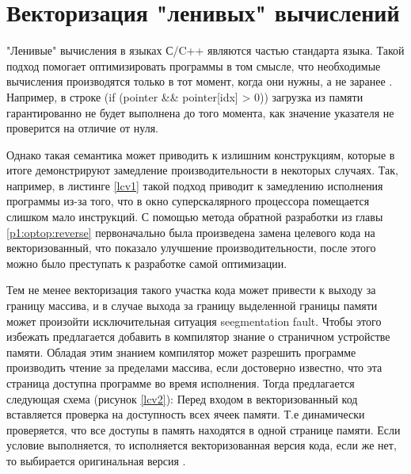  \section {Векторизация "ленивых"\phantom{ } вычислений}\label{ch2:lcv}
 "Ленивые"\phantom{ } вычисления в языках С/C++ являются частью стандарта языка. Такой подход помогает оптимизировать программы в том смысле, что необходимые вычисления производятся только в тот момент, когда они нужны, а не заранее \cite{cukic2018functional}. Например, в строке (if (pointer \&\& pointer[idx] > 0)) загрузка из памяти гарантированно  не будет выполнена до того момента, как значение указателя не проверится на отличие от нуля. 
 
 Однако такая семантика может приводить к излишним конструкциям, которые в итоге демонстрируют замедление производительности в некоторых случаях.
 Так, например, в листинге \ref{lcv1} такой подход приводит к замедлению исполнения программы из-за того, что в окно суперскалярного процессора помещается слишком мало инструкций. С помощью метода обратной разработки из главы \ref{p1:optop:reverse} первоначально была произведена замена целевого кода на векторизованный, что показало улучшение производительности, после этого можно было преступать к разработке самой оптимизации.
 
 
 Тем не менее векторизация такого участка кода может привести к выходу за границу массива, и в случае выхода за границу выделенной границы памяти может произойти исключительная ситуация seegmentation fault. Чтобы этого избежать предлагается добавить в компилятор знание о страничном устройстве памяти. Обладая этим знанием компилятор может разрешить программе производить чтение за пределами массива, если достоверно известно, что эта страница доступна  программе во время исполнения. Тогда предлагается следующая схема (рисунок \ref{lcv2}):
Перед входом в векторизованный код вставляется проверка на доступность всех ячеек памяти. Т.е  динамически проверяется, что все доступы в память находятся в одной странице памяти. Если условие выполняется, то исполняется векторизованная версия кода, если же нет, то выбирается оригинальная версия \cite{confmiptlazy}.
 
